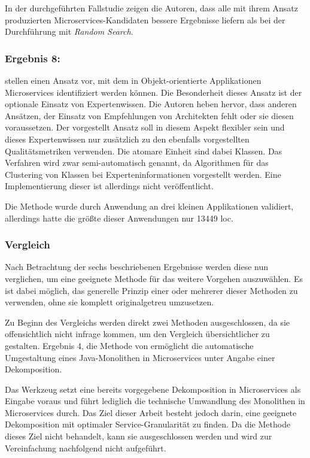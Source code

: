 In der durchgeführten Fallstudie zeigen die Autoren, dass alle mit ihrem Ansatz produzierten Microservices-Kandidaten bessere Ergebnisse liefern als bei der Durchführung mit \emph{Random Search}.

\subsubsection{Ergebnis 8:  \cite{arh-result-no-qas}}

\citeauthor{arh-result-no-qas} stellen einen Ansatz vor, mit dem in Objekt-orientierte Applikationen Microservices identifiziert werden können.
Die Besonderheit dieses Ansatz ist der optionale Einsatz von Expertenwissen.
Die Autoren heben hervor, dass anderen Ansätzen, der Einsatz von Empfehlungen von Architekten fehlt oder sie diesen voraussetzen.
Der vorgestellt Ansatz soll in diesem Aspekt flexibler sein und dieses Expertenwissen nur zusätzlich zu den ebenfalls vorgestellten Qua\-li\-täts\-metriken verwenden.
Die atomare Einheit sind dabei Klassen.
Das Verfahren wird zwar semi-automatisch genannt, da Algorithmen für das Clustering von Klassen bei Experteninformationen vorgestellt werden.
Eine Implementierung dieser ist allerdings nicht veröffentlicht.

Die Methode wurde durch Anwendung an drei kleinen Applikationen validiert, allerdings hatte die größte dieser Anwendungen nur 13449 \gls{loc}.

\subsubsection{Vergleich}

Nach Betrachtung der sechs beschriebenen Ergebnisse werden diese nun verglichen, um eine geeignete Methode für das weitere Vorgehen auszuwählen.
Es ist dabei möglich, das generelle Prinzip einer oder mehrerer dieser Methoden zu verwenden, ohne sie komplett originalgetreu umzusetzen.

Zu Beginn des Vergleichs werden direkt zwei Methoden ausgeschlossen, da sie offensichtlich nicht infrage kommen, um den Vergleich übersichtlicher zu gestalten. 
Ergebnis 4, die Methode von  ermöglicht die automatische Umgestaltung eines Java-Monolithen in Microservices unter Angabe einer Dekomposition.

Das Werkzeug setzt eine bereits vorgegebene Dekomposition in Microservices als Eingabe voraus und führt lediglich die technische Umwandlung des Monolithen in Microservices durch. 
Das Ziel dieser Arbeit besteht jedoch darin, eine geeignete Dekomposition mit optimaler Service-Granularität zu finden. 
Da die Methode dieses Ziel nicht behandelt, kann sie ausgeschlossen werden und wird zur Vereinfachung nachfolgend nicht aufgeführt.

